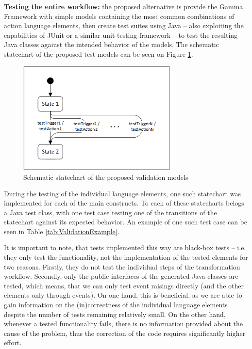 \textbf{Testing the entire workflow:} the proposed alternative is provide the Gamma Framework with simple models containing the most common combinations of action language elements, then create test suites using Java -- also exploiting the capabilities of JUnit or a similar unit testing framework -- to test the resulting Java classes against the intended behavior of the models. The schematic statechart of the proposed test models can be seen on Figure \ref{fig:validationStatechart}.

\begin{figure}[!h]
	\centering
	\includegraphics[width=80mm, keepaspectratio]{figures/validationStatechart.png}
	\caption{Schematic statechart of the proposed validation models}
	\label{fig:validationStatechart}
\end{figure}

During the testing of the individual language elements, one such statechart was implemented for each of the main constructs. To each of these statecharts belogs a Java test class, with one test case testing one of the transitions of the statechart against its expected behavior. An example of one such test case can be seen in Table \ref{tab:ValidationExample}.

It is important to note, that tests implemented this way are black-box tests -- i.e. they only test the functionality, not the implementation of the tested elements for two reasons. Firstly, they do not test the individual steps of the transformation workflow. Secondly, only the public interfaces of the generated Java classes are tested, which means, that we can only test event raisings directly (and the other elements only through events). On one hand, this is beneficial, as we are able to gain information on the (in)correctness of the individual language elements despite the number of tests remaining relatively small. On the other hand, whenever a tested functionality fails, there is no information provided about the cause of the problem, thus the correction of the code requires significantly higher effort.

